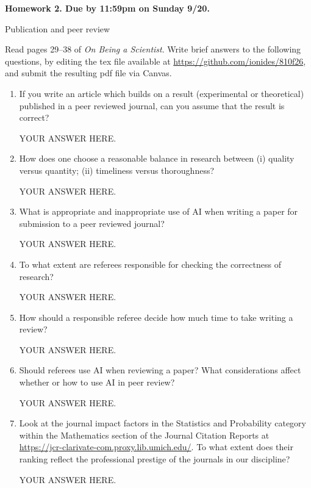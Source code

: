 \documentclass[12pt]{article}
\begin{document}
\begin{center}\bf
Homework 2. Due by 11:59pm on Sunday 9/20.

Publication and peer review

\end{center}

Read pages 29--38 of {\em On Being a Scientist}. Write brief answers to the following questions, by editing the tex file available at \url{https://github.com/ionides/810f26}, and submit the resulting pdf file via Canvas. 

\begin{enumerate}
\item If you write an article which builds on a result (experimental or theoretical) published in a peer reviewed journal, can you assume that the result is correct?

YOUR ANSWER HERE.

\item How does one choose a reasonable balance in research between (i) quality versus quantity; (ii) timeliness versus thoroughness?

YOUR ANSWER HERE.

\item What is appropriate and inappropriate use of AI when writing a paper for submission to a peer reviewed journal?
  
YOUR ANSWER HERE.
  
\item To what extent are referees responsible for checking the correctness of research? 

YOUR ANSWER HERE.

\item How should a responsible referee decide how much time to take writing a review? 

YOUR ANSWER HERE.

\item Should referees use AI when reviewing a paper? What considerations affect whether or how to use AI in peer review?

YOUR ANSWER HERE.

\item Look at the journal impact factors in the Statistics and Probability category within the Mathematics section of the Journal Citation Reports at \url{https://jcr-clarivate-com.proxy.lib.umich.edu/}. To what extent does their ranking reflect the professional prestige of the journals in our discipline?

YOUR ANSWER HERE.


\end{enumerate}
\end{document}
